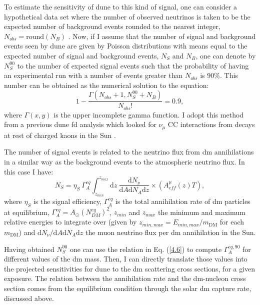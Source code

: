 To estimate the sensitivity of \gls{dune} to this kind of signal, one can consider a hypothetical data set where the number of observed neutrinos is taken to be the expected number of background events rounded to the nearest integer, $N_{obs} = \mathrm{round}(N_{B})$ \cite{Cowan2010}. Now, if I assume that the number of signal and background events seen by \gls{dune} are given by Poisson distributions with means equal to the expected number of signal and background events, $N_{S}$ and $N_{B}$, one can denote by $N_{S}^{90}$ to the number of expected signal events such that the probability of having an experimental run with a number of events greater than $N_{obs}$ is $90\%$. This number can be obtained as the numerical solution to the equation:
\begin{equation}\label{4.5}
	1 - \frac{\Gamma\left(N_{obs}+1, N_{S}^{90}+N_{B}\right)}{N_{obs}!} = 0.9,
\end{equation}
where $\Gamma(x,y)$ is the upper incomplete gamma function. I adopt this method from a previous \gls{dune} \gls{fd} analysis which looked for $\nu_{\mu}$ CC interactions from decays at rest of charged kaons in the Sun \cite{DUNE2021}.

The number of signal events is related to the neutrino flux from \gls{dm} annihilations in a similar way as the background events to the atmospheric neutrino flux. In this case I have:
\begin{equation}\label{4.6}
	N_{S} = \eta_{S} \ \Gamma_{A}^{eq} \int_{z_{min}}^{z_{max}} \mathrm{d}z \ \frac{\mathrm{d}N_{\nu}}{\mathrm{d}A \mathrm{d}N_{A} \mathrm{d}z}  \times \left(A_{eff}^{\mu}(z) T\right),
\end{equation}
where $\eta_{S}$ is the signal efficiency, $\Gamma_{A}^{eq}$ is the total annihilation rate of \gls{dm} particles at equilibrium, $\Gamma_{A}^{eq} = A_{\odot} \left(N_{DM}^{eq}\right)^{2}$, $z_{min}$ and $z_{max}$ the minimum and maximum relative energies to integrate over (given by $z_{min, max} = E_{min, max}/m_{\mathrm{DM}}$ for each $m_{\mathrm{DM}}$) and $\mathrm{d}N_{\nu}/\mathrm{d}A \mathrm{d}N_{A} \mathrm{d}z$ the muon neutrino flux per \gls{dm} annihilation in the Sun.

Having obtained $N_{S}^{90}$ one can use the relation in Eq. (\ref{4.6}) to compute $\Gamma_{A}^{eq,90}$ for different values of the \gls{dm} mass. Then, I can directly translate those values into the projected sensitivities for \gls{dune} to the \gls{dm} scattering cross sections, for a given exposure. The relation between the annihilation rate and the \gls{dm}-nucleon cross section comes from the equilibrium condition through the solar \gls{dm} capture rate, discussed above.

